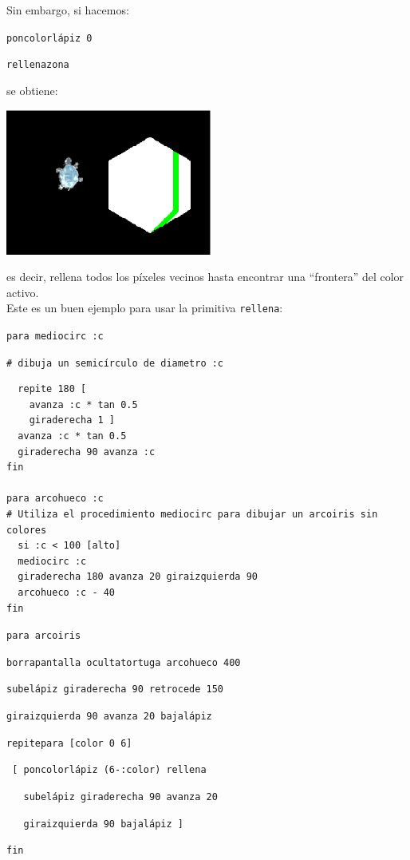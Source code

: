\noindent Sin embargo, si hacemos:

\texttt{poncolorl\'apiz 0}

\texttt{rellenazona}

\noindent se obtiene:
\begin{center}
   \includegraphics[scale=0.6]{Imagenes/05_Primitivas/relleno3.png}
\end{center}
es decir, rellena todos los p\'ixeles vecinos hasta encontrar una
``frontera'' del color activo.\\

\noindent Este es un buen ejemplo para usar la primitiva \texttt{rellena}:

\noindent \texttt{para mediocirc :c}

\noindent \texttt{\# dibuja un semic\'irculo de diametro :c}
\begin{verbatim}  repite 180 [
    avanza :c * tan 0.5
    giraderecha 1 ]
  avanza :c * tan 0.5
  giraderecha 90 avanza :c
fin

para arcohueco :c
# Utiliza el procedimiento mediocirc para dibujar un arcoiris sin colores
  si :c < 100 [alto]
  mediocirc :c
  giraderecha 180 avanza 20 giraizquierda 90
  arcohueco :c - 40
fin
\end{verbatim}

\noindent \texttt{para arcoiris}

 \texttt{borrapantalla ocultatortuga arcohueco 400}

  \texttt{subel\'apiz giraderecha 90 retrocede 150}

 \texttt{giraizquierda 90 avanza 20 bajal\'apiz}

 \texttt{repitepara [color 0 6]}

 \texttt{ [ poncolorl\'apiz (6-:color) rellena} 

 \verb+  +\texttt{ subel\'apiz giraderecha 90 avanza 20}

 \verb+  +\texttt{ giraizquierda 90 bajal\'apiz ]}

\noindent \texttt{fin}

